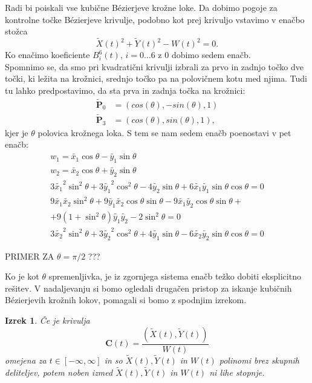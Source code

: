 \documentclass[a4paper,11pt]{article}
\theoremstyle{definition}
\theoremstyle{plain}
\newtheorem*{izrek}{Izrek}
\begin{document}
Radi bi poiskali vse kubične B\'ezierjeve krožne loke. Da dobimo pogoje za kontrolne točke B\'ezierjeve krivulje, podobno kot prej krivuljo vstavimo v enačbo stožca
$$ \tilde{X}(t)^2+\tilde{Y}(t)^2-W(t)^2=0.$$
Ko enačimo koeficiente $B_i^6(t),\,i=0\ldots6$ z $0$ dobimo sedem enačb.\\
Spomnimo se, da smo pri kvadratični krivulji izbrali za prvo in zadnjo točko dve točki, ki ležita na krožnici, srednjo točko pa na polovičnem kotu med njima. Tudi tu lahko predpostavimo, da sta prva in zadnja točka na krožnici:
\begin{align*}
\boldsymbol{\tilde{P}}_0 &= (cos(\theta), -sin(\theta), 1)\\
\boldsymbol{\tilde{P}}_3 &= (cos(\theta), sin(\theta), 1),
\end{align*}
kjer je $\theta$ polovica krožnega loka.  S tem se nam sedem enačb poenostavi v pet enačb:
\begin{align*}
w_1 = \tilde{x_1}\cos{\theta} - \tilde{y_1} \sin{\theta}   \\
w_2 = \tilde{x_2}\cos{\theta} + \tilde{y_2} \sin{\theta}   \\
3\tilde{x_1}^2\sin^2{\theta} + 3\tilde{y_1}^2\cos^2{\theta} - 4\tilde{y_2} \sin{\theta}  + 6\tilde{x_1}\tilde{y_1} \sin{\theta} \cos{\theta} = 0 \\
9\tilde{x_1}\tilde{x_2}\sin^2{\theta} + 9\tilde{y_1}\tilde{x_2}\cos{\theta} \sin{\theta} - 9\tilde{x_1} \tilde{y_2} \cos{\theta} \sin{\theta}+ \\
+ 9 (1 + \sin^2{\theta}) \tilde{y_1} \tilde{y_2} - 2\sin^2{\theta} = 0 \\
3\tilde{x_2}^2 \sin^2{\theta}+ 3\tilde{y_2}^2 \cos^2{\theta}+ 4\tilde{y_1} \sin{\theta}  - 6\tilde{x_2}\tilde{y_2}\sin{\theta} \cos{\theta}  = 0 
\end{align*}

PRIMER ZA $\theta=\pi/2$ ???

Ko je kot $\theta$ spremenljivka, je iz zgornjega sistema enačb težko dobiti eksplicitno rešitev. V nadaljevanju si bomo ogledali drugačen pristop za iskanje kubičnih B\'ezierjevih krožnih lokov, pomagali si bomo z spodnjim izrekom.

\begin{izrek}
Če je krivulja
$$\boldsymbol{C}(t)=\frac{(\tilde{X}(t),\tilde{Y}(t))}{W(t)}$$
omejena za $t\in [-\infty,\infty]$ in so $\tilde{X}(t),\tilde{Y}(t)$ in $W(t)$ polinomi brez skupnih deliteljev, potem noben izmed $\tilde{X}(t),\tilde{Y}(t)$ in $W(t)$ ni lihe stopnje.
\end{izrek}
\end{document}
